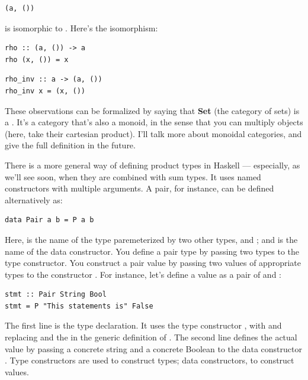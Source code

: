 \begin{verbatim}
(a, ())
\end{verbatim}

\noindent
is isomorphic to . Here's the isomorphism:

\begin{verbatim}
rho :: (a, ()) -> a
rho (x, ()) = x
\end{verbatim}

\begin{verbatim}
rho_inv :: a -> (a, ())
rho_inv x = (x, ())
\end{verbatim}

\noindent
These observations can be formalized by saying that \textbf{Set} (the
category of sets) is a . It's a category that's
also a monoid, in the sense that you can multiply objects (here, take
their cartesian product). I'll talk more about monoidal categories, and
give the full definition in the future.

There is a more general way of defining product types in Haskell ---
especially, as we'll see soon, when they are combined with sum types. It
uses named constructors with multiple arguments. A pair, for instance,
can be defined alternatively as:

\begin{verbatim}
data Pair a b = P a b
\end{verbatim}

Here,  is the name of the type paremeterized by two
other types,  and ; and  is the name of
the data constructor. You define a pair type by passing two types to the
 type constructor. You construct a pair value by passing
two values of appropriate types to the constructor . For
instance, let's define a value  as a pair of
 and :

\begin{verbatim}
stmt :: Pair String Bool
stmt = P "This statements is" False
\end{verbatim}

\noindent
The first line is the type declaration. It uses the type constructor
, with  and  replacing
 and the  in the generic definition of
. The second line defines the actual value by passing a
concrete string and a concrete Boolean to the data constructor
. Type constructors are used to construct types; data
constructors, to construct values.

